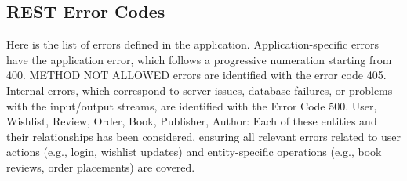 \subsection{REST Error Codes}


Here is the list of errors defined in the application. Application-specific errors have the application error, which follows a progressive numeration starting from 400. METHOD NOT ALLOWED errors are identified with the error code 405. Internal errors, which correspond to server issues, database failures, or problems with the input/output streams, are identified with the Error Code 500. User, Wishlist, Review, Order, Book, Publisher, Author: Each of these entities and their relationships has been considered, ensuring all relevant errors related to user actions (e.g., login, wishlist updates) and entity-specific operations (e.g., book reviews, order placements) are covered.



